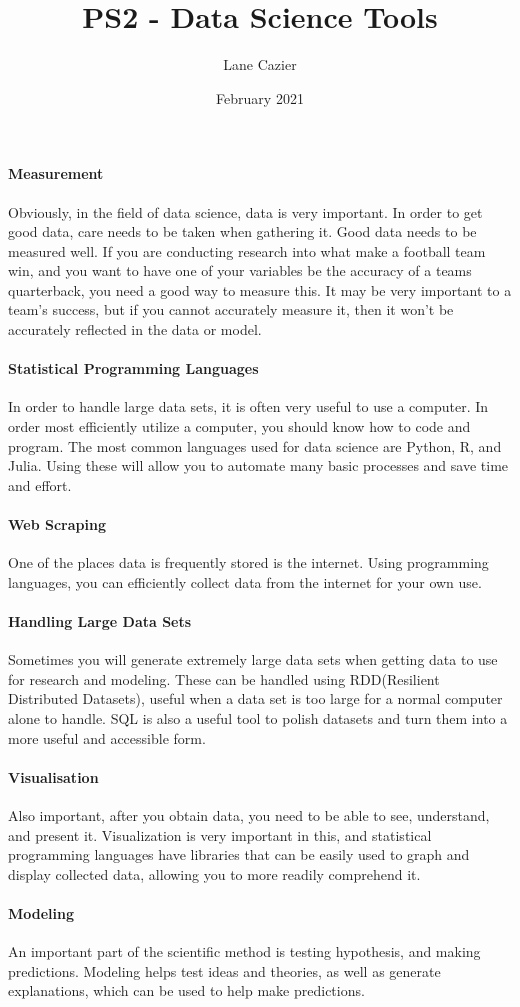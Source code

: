 \documentclass{article}
\title{PS2 - Data Science Tools}
\author{Lane Cazier}
\date{February 2021}
\begin{document}
\maketitle

\paragraph{Measurement}
Obviously, in the field of data science, data is very important. In order to get good data, care needs to be taken when gathering it. Good data needs to be measured well. If you are conducting research into what make a football team win, and you want to have one of your variables be the accuracy of a teams quarterback, you need a good way to measure this. It may be very important to a team's success, but if you cannot accurately measure it, then it won't be accurately reflected in the data or model. 


\paragraph{Statistical Programming Languages}
In order to handle large data sets, it is often very useful to use a computer. In order most efficiently utilize a computer, you should know how to code and program. The most common languages used for data science are Python, R, and Julia. Using these will allow you to automate many basic processes and save time and effort. 

\paragraph{Web Scraping}
One of the places data is frequently stored is the internet. Using programming languages, you can efficiently collect data from the internet for your own use.

\paragraph{Handling Large Data Sets}
Sometimes you will generate extremely large data sets when getting data to use for research and modeling. These can be handled using RDD(Resilient Distributed Datasets), useful when a data set is too large for a normal computer alone to handle. SQL is also a useful tool to polish datasets and turn them into a more useful and accessible form. 

\paragraph{Visualisation}
Also important, after you obtain data, you need to be able to see, understand, and present it. Visualization is very important in this, and statistical programming languages have libraries that can be easily used to graph and display collected data, allowing you to more readily comprehend it. 

\paragraph{Modeling}
An important part of the scientific method is testing hypothesis, and making predictions. Modeling helps test ideas and theories, as well as generate explanations, which can be used to help make predictions. 
\end{document}
